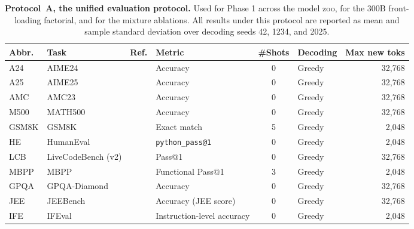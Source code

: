 \begin{table}[htbp]
\centering
\caption{%
\textbf{Protocol~A, the unified evaluation protocol.} Used for Phase 1 across the model
zoo, for the 300B front-loading factorial, and for the mixture ablations. All results
under this protocol are reported as mean and sample standard deviation over decoding
seeds 42, 1234, and 2025.%
}
\label{tab:eval-settings-A}
\scriptsize
\setlength{\tabcolsep}{3pt}
\begin{tabularx}{\linewidth}{@{}l l l >{\raggedright\arraybackslash}X c l r@{}}
\toprule
\textbf{Abbr.} & \textbf{Task} & \textbf{Ref.} & \textbf{Metric} & \textbf{\#Shots} & \textbf{Decoding} & \textbf{Max new toks} \\
\midrule
A24   & AIME24             & \citep{aime2024}              & Accuracy                     & 0 & Greedy & 32,768 \\
A25   & AIME25             & \citep{aime2025}              & Accuracy                     & 0 & Greedy & 32,768 \\
AMC   & AMC23              & \citep{maa2023amc}            & Accuracy                     & 0 & Greedy & 32,768 \\
M500  & MATH500            & \citep{hendrycks2021math}     & Accuracy                     & 0 & Greedy & 32,768 \\
GSM8K & GSM8K              & \citep{cobbe2021training}     & Exact match                  & 5 & Greedy &  2,048 \\
HE    & HumanEval          & \citep{chen2021evaluating}    & \texttt{python\_pass@1}      & 0 & Greedy &  2,048 \\
LCB   & LiveCodeBench (v2) & \citep{jain2024livecodebench} & Pass@1                       & 0 & Greedy & 32,768 \\
MBPP  & MBPP               & \citep{austin2021program}     & Functional Pass@1            & 3 & Greedy &  2,048 \\
GPQA  & GPQA-Diamond       & \citep{rein2024gpqa}          & Accuracy                     & 0 & Greedy & 32,768 \\
JEE   & JEEBench           & \citep{arora2023have}         & Accuracy (JEE score)         & 0 & Greedy & 32,768 \\
IFE   & IFEval             & \citep{zhou2023instruction}   & Instruction-level accuracy   & 0 & Greedy &  2,048 \\
\bottomrule
\end{tabularx}
\end{table}

